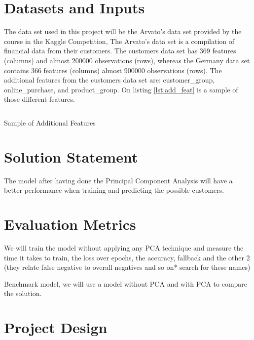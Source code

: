 \hypertarget{datasets-and-inputs}{%
\section{Datasets and Inputs}\label{datasets-and-inputs}}

The data set used in this project will be the Arvato's data set provided
by the course in the Kaggle Competition\cite{arvato_kaggle_competition},
The Arvato's data set is a compilation of financial data from their
customers. The customers data set has 369 features (columns) and almost
200000 observations (rows), whereas the Germany data set contains 366
features (columns) almost 900000 observations (rows). The additional
features from the customers data set are: customer\_group,
online\_purchase, and product\_group. On listing \ref{lst:add_feat} is a
sample of those different features.

\begin{listing}[htp]
  \inputminted{python}{code/sample_additional_features.py}
  \caption{Sample of Additional Features}
  \label{lst:add_feat}
\end{listing}

\hypertarget{solution-statement}{%
\section{Solution Statement}\label{solution-statement}}

The model after having done the Principal Component Analysis will have a
better performance when training and predicting the possible customers.

\hypertarget{evaluation-metrics}{%
\section{Evaluation Metrics}\label{evaluation-metrics}}

We will train the model without applying any PCA technique and measure
the time it takes to train, the loss over epochs, the accuracy, fallback
and the other 2 (they relate false negative to overall negatives and so
on* search for these names)

Benchmark model, we will use a model without PCA and with PCA to compare
the solution.

\hypertarget{project-design}{%
\section{Project Design}\label{project-design}}

